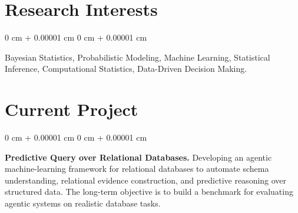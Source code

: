 \documentclass[10pt, letterpaper]{article}
\newenvironment{highlightsforbulletentries}{
    \begin{itemize}[
        topsep=0.10 cm,
        parsep=0.10 cm,
        partopsep=0pt,
        itemsep=0pt,
        leftmargin=10pt
    ]
}{
    \end{itemize}
} %
\newenvironment{onecolentry}{
    \begin{adjustwidth}{
        0 cm + 0.00001 cm
    }{
        0 cm + 0.00001 cm
    }
}{
    \end{adjustwidth}
} %
\begin{document}
    








    \section{Research Interests} 
        \begin{onecolentry}
         Bayesian Statistics, Probabilistic Modeling, Machine Learning, Statistical Inference, Computational Statistics, Data-Driven Decision Making. 
        \end{onecolentry}

        \vspace{0.2 cm}
    \section{Current Project}

        \begin{onecolentry}
            \textbf{Predictive Query over Relational Databases.} Developing an agentic machine-learning framework for relational databases to automate schema understanding, relational evidence construction, and predictive reasoning over structured data. The long-term objective is to build a benchmark for evaluating agentic systems on realistic database tasks.
        \end{onecolentry}
\end{document}
